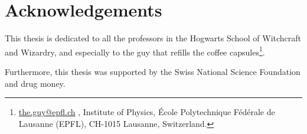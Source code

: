 \Clear
\chapter*{Acknowledgements}
\label{cha:acknowledgements}

\newcommand\email[1]{
	\href{mailto:#1}{#1}
}

This thesis is dedicated to all the professors in the Hogwarts School of Witchcraft and Wizardry, and especially to the guy that refills the coffee capsules\footnote{\email{the.guy@epfl.ch}, Institute of Physics, École Polytechnique Fédérale de Lausanne (EPFL), CH-1015 Lausanne, Switzerland.}.

Furthermore, this thesis was supported by the Swiss National Science Foundation and drug money.


